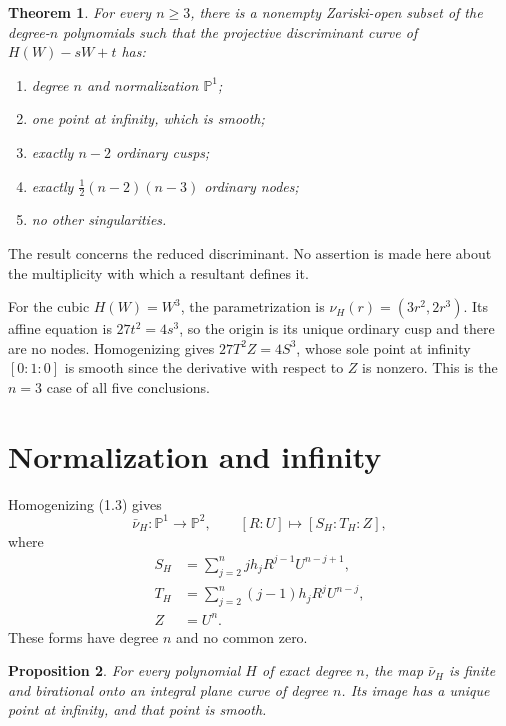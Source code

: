 \documentclass[11pt]{article}
\newtheorem{theorem}{Theorem}[section]
\newtheorem{proposition}[theorem]{Proposition}
\newcommand{\Pone}{\mathbb P^1}
\begin{document}
\begin{theorem}\label{thm:main}
For every \(n\geq3\), there is a nonempty Zariski-open subset of the
degree-\(n\) polynomials such that the projective discriminant curve of
\(H(W)-sW+t\) has:
\begin{enumerate}
\item degree \(n\) and normalization \(\Pone\);
\item one point at infinity, which is smooth;
\item exactly \(n-2\) ordinary cusps;
\item exactly \(\frac12(n-2)(n-3)\) ordinary nodes;
\item no other singularities.
\end{enumerate}
\end{theorem}

The result concerns the reduced discriminant.  No assertion is made here
about the multiplicity with which a resultant defines it.

For the cubic \(H(W)=W^3\), the parametrization is
\(\nu_H(r)=(3r^2,2r^3)\).  Its affine equation is
\(27t^2=4s^3\), so the origin is its unique ordinary cusp and there are no
nodes.  Homogenizing gives \(27T^2Z=4S^3\), whose sole point at infinity
\([0:1:0]\) is smooth since the derivative with respect to \(Z\) is nonzero.
This is the \(n=3\) case of all five conclusions.

\section{Normalization and infinity}

Homogenizing (1.3) gives
\[
  \bar\nu_H:\Pone\longrightarrow\mathbb P^2,\qquad
  [R:U]\longmapsto[S_H:T_H:Z],                            \tag{2.1}
\]
where
\begin{align*}
 S_H&=\sum_{j=2}^n jh_jR^{j-1}U^{n-j+1},\\
 T_H&=\sum_{j=2}^n (j-1)h_jR^jU^{n-j},\\
 Z&=U^n.
\end{align*}
These forms have degree \(n\) and no common zero.

\begin{proposition}\label{prop:normalization}
For every polynomial \(H\) of exact degree \(n\), the map
\(\bar\nu_H\) is finite and birational onto an integral plane curve of
degree \(n\).  Its image has a unique point at infinity, and that point is
smooth.
\end{proposition}
\end{document}
